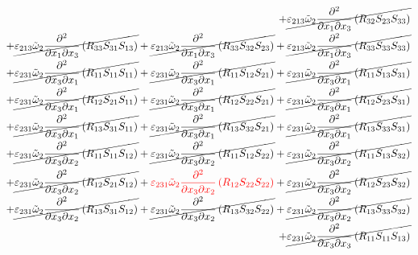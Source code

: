 \begin{equation}
\begin{split}
		+\cancel{\varepsilon_{213}\tilde{\omega}_{2}\pdv{}{x_{1}}{x_{3}}\left(R_{32}S_{23}S_{33}\right)}\\
		+\cancel{\varepsilon_{213}\tilde{\omega}_{2}\pdv{}{x_{1}}{x_{3}}\left(R_{33}S_{31}S_{13}\right)}
		+\cancel{\varepsilon_{213}\tilde{\omega}_{2}\pdv{}{x_{1}}{x_{3}}\left(R_{33}S_{32}S_{23}\right)}
		+\cancel{\varepsilon_{213}\tilde{\omega}_{2}\pdv{}{x_{1}}{x_{3}}\left(R_{33}S_{33}S_{33}\right)}\\
		+\cancel{\varepsilon_{231}\tilde{\omega}_{2}\pdv{}{x_{3}}{x_{1}}\left(R_{11}S_{11}S_{11}\right)}
		+\cancel{\varepsilon_{231}\tilde{\omega}_{2}\pdv{}{x_{3}}{x_{1}}\left(R_{11}S_{12}S_{21}\right)}
		+\cancel{\varepsilon_{231}\tilde{\omega}_{2}\pdv{}{x_{3}}{x_{1}}\left(R_{11}S_{13}S_{31}\right)}\\
		+\cancel{\varepsilon_{231}\tilde{\omega}_{2}\pdv{}{x_{3}}{x_{1}}\left(R_{12}S_{21}S_{11}\right)}
		+\cancel{\varepsilon_{231}\tilde{\omega}_{2}\pdv{}{x_{3}}{x_{1}}\left(R_{12}S_{22}S_{21}\right)}
		+\cancel{\varepsilon_{231}\tilde{\omega}_{2}\pdv{}{x_{3}}{x_{1}}\left(R_{12}S_{23}S_{31}\right)}\\
		+\cancel{\varepsilon_{231}\tilde{\omega}_{2}\pdv{}{x_{3}}{x_{1}}\left(R_{13}S_{31}S_{11}\right)}
		+\cancel{\varepsilon_{231}\tilde{\omega}_{2}\pdv{}{x_{3}}{x_{1}}\left(R_{13}S_{32}S_{21}\right)}
		+\cancel{\varepsilon_{231}\tilde{\omega}_{2}\pdv{}{x_{3}}{x_{1}}\left(R_{13}S_{33}S_{31}\right)}\\
		+\cancel{\varepsilon_{231}\tilde{\omega}_{2}\pdv{}{x_{3}}{x_{2}}\left(R_{11}S_{11}S_{12}\right)}
		+\cancel{\varepsilon_{231}\tilde{\omega}_{2}\pdv{}{x_{3}}{x_{2}}\left(R_{11}S_{12}S_{22}\right)}
		+\cancel{\varepsilon_{231}\tilde{\omega}_{2}\pdv{}{x_{3}}{x_{2}}\left(R_{11}S_{13}S_{32}\right)}\\
		+\cancel{\varepsilon_{231}\tilde{\omega}_{2}\pdv{}{x_{3}}{x_{2}}\left(R_{12}S_{21}S_{12}\right)}
		+{\color{red}\varepsilon_{231}\tilde{\omega}_{2}\pdv{}{x_{3}}{x_{2}}\left(R_{12}S_{22}S_{22}\right)}
		+\cancel{\varepsilon_{231}\tilde{\omega}_{2}\pdv{}{x_{3}}{x_{2}}\left(R_{12}S_{23}S_{32}\right)}\\
		+\cancel{\varepsilon_{231}\tilde{\omega}_{2}\pdv{}{x_{3}}{x_{2}}\left(R_{13}S_{31}S_{12}\right)}
		+\cancel{\varepsilon_{231}\tilde{\omega}_{2}\pdv{}{x_{3}}{x_{2}}\left(R_{13}S_{32}S_{22}\right)}
		+\cancel{\varepsilon_{231}\tilde{\omega}_{2}\pdv{}{x_{3}}{x_{2}}\left(R_{13}S_{33}S_{32}\right)}\\
		+\cancel{\varepsilon_{231}\tilde{\omega}_{2}\pdv{}{x_{3}}{x_{3}}\left(R_{11}S_{11}S_{13}\right)}

\end{split}
\end{equation}
